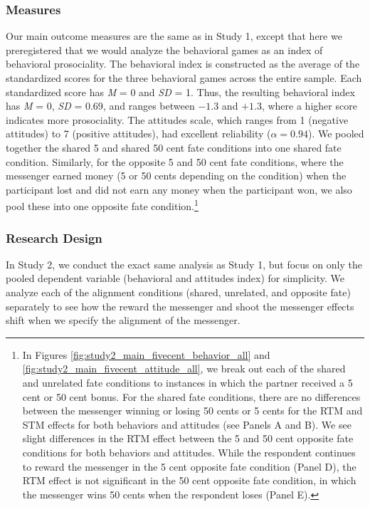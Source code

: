 \subsubsection{Measures}

Our main outcome measures are the same as in Study 1, except that here
we preregistered that we would analyze the behavioral games as an index
of behavioral prosociality. The behavioral index is constructed as the
average of the standardized scores for the three behavioral games across
the entire sample. Each standardized score has \emph{M} = 0 and
\emph{SD} = 1. Thus, the resulting behavioral index has \emph{M} = 0,
\emph{SD} = 0.69, and ranges between $-1.3$ and $+1.3$, where a higher score
indicates more prosociality. The attitudes scale, which ranges from 1
(negative attitudes) to 7 (positive attitudes), had excellent
reliability ($\alpha = 0.94$). We pooled together the shared 5 and shared
50 cent fate conditions into one shared fate condition. 
Similarly, for the opposite 5 and 50 cent fate conditions, 
where the messenger earned money (5 or 50 cents
depending on the condition) when the participant lost and did not earn
any money when the participant won, we also pool these into one opposite fate 
condition.\footnote{In Figures
\ref{fig:study2_main_fivecent_behavior_all} and \ref{fig:study2_main_fivecent_attitude_all}, 
we break out each of the shared and
unrelated fate conditions to instances in which the partner received a 5 cent or
50 cent bonus. For the shared fate conditions, there are no differences between
the messenger winning or losing 50 cents or 5 cents for the RTM and STM effects
for both behaviors and attitudes (see Panels A and B). We see slight differences in the 
RTM effect between the 5 and 50 cent opposite fate conditions for both behaviors and attitudes. 
While the respondent continues to reward the messenger in the 5 cent opposite fate condition (Panel D), 
the RTM effect is not significant in the 50 cent opposite fate condition, in which
 the messenger wins 50 cents when the respondent
loses (Panel E).}

\subsubsection{Research Design}
In Study 2, we conduct the exact same analysis as Study 1, but focus on only the pooled
dependent variable (behavioral and attitudes index) for simplicity. We
analyze each of the alignment conditions (shared, unrelated, and
opposite fate) separately to see how the reward the messenger and shoot
the messenger effects shift when we specify the alignment of the
messenger.